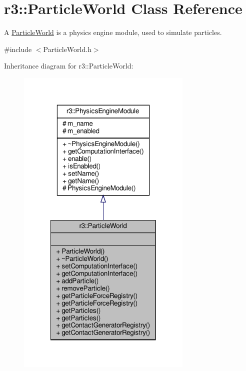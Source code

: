 \hypertarget{classr3_1_1_particle_world}{}\section{r3\+:\+:Particle\+World Class Reference}
\label{classr3_1_1_particle_world}


A \mbox{\hyperlink{classr3_1_1_particle_world}{Particle\+World}} is a physics engine module, used to simulate particles.  




{\ttfamily \#include $<$Particle\+World.\+h$>$}



Inheritance diagram for r3\+:\+:Particle\+World\+:\nopagebreak
\begin{figure}[H]
\begin{center}
\leavevmode
\includegraphics[width=238pt]{classr3_1_1_particle_world__inherit__graph}
\end{center}
\end{figure}


